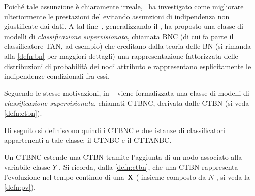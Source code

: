 Poiché tale assunzione è chiaramente irreale,~\citet{Friedman1997} ha investigato come migliorare ulteriormente le prestazioni del \nb{} \upcase \class{} evitando assunzioni di indipendenza non giustificate dai dati. A tal fine~\citet{Friedman1997}, generalizzando il \nb{} \upcase \class{}, ha proposto una classe di modelli di \emph{classificazione supervisionata}, chiamata \acf{BNC} (di cui fa parte il classificatore \acf{TAN}, ad esempio) che ereditano dalla teoria delle \acl{BN} (si rimanda alla \autoref{defn:bn} per maggiori dettagli) una rappresentazione fattorizzata delle distribuzioni di probabilità dei nodi attributo e rappresentano esplicitamente le indipendenze condizionali fra essi.

Seguendo le stesse motivazioni, in ~\citet{Stella2012} viene formalizzata una classe di modelli di \emph{classificazione supervisionata}, chiamati \acf{CTBNC}, derivata dalle \acs{CTBN} (si veda \autoref{defn:ctbn}).

Di seguito si definiscono quindi i \acl{CTBNC} e due istanze di classificatori appartenenti a tale classe: il \acf{CTNBC} e il \acf{CTTANBC}.

Un \acl{CTBNC} estende una \acs{CTBN} tramite l'aggiunta di un nodo associato alla variabile classe $\mathnormal{Y}$. Si ricorda, dalla \autoref{defn:ctbn}, che una \acs{CTBN} rappresenta l'evoluzione nel tempo continuo di una \pv{} $\mathbf{X}$ (\ie{} insieme composto da $N$ \mprocess{}, si veda la \autoref{defn:pv}).

